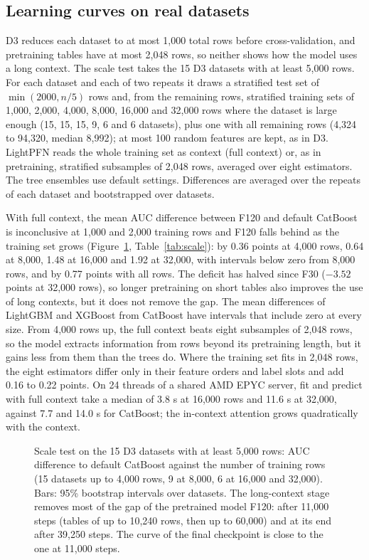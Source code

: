 \documentclass[11pt]{article}
\begin{document}
\subsection{Learning curves on real datasets}
D3 reduces each dataset to at most 1,000 total rows before cross-validation, and pretraining tables have
at most 2,048 rows, so neither
shows how the model uses a long context. The scale test takes the 15 D3 datasets with at least 5,000
rows. For each dataset and each of two repeats it draws a stratified test set of $\min(2000,n/5)$ rows
and, from the remaining rows, stratified training sets of 1,000, 2,000, 4,000, 8,000, 16,000 and
32,000 rows where the dataset is large enough (15, 15, 15, 9, 6 and 6 datasets), plus one with all
remaining rows (4,324 to 94,320, median 8,992); at most 100 random features are kept, as in D3.
LightPFN reads the whole training set as context (full context) or, as in pretraining, stratified
subsamples of 2,048 rows, averaged over eight estimators. The tree ensembles use default settings.
Differences are averaged over the repeats of each dataset and bootstrapped over datasets.

With full context, the mean AUC difference between F120 and default CatBoost is inconclusive at
1,000 and 2,000 training rows and F120 falls
behind as the training set grows (Figure~\ref{fig:scale}, Table~\ref{tab:scale}): by 0.36 points at
4,000 rows, 0.64 at 8,000, 1.48 at 16,000 and 1.92 at 32,000, with intervals below zero from 8,000
rows, and by 0.77 points with all rows. The deficit has halved since F30 ($-3.52$ points at 32,000
rows), so longer pretraining on short tables also improves the use of long contexts, but it does not
remove the gap. The mean differences of LightGBM and XGBoost from CatBoost have intervals that include
zero at every size. From 4,000 rows up, the
full context beats eight subsamples of 2,048 rows, so the model extracts information from rows beyond
its pretraining length, but it gains less from them than the trees do. Where the training set fits in
2,048 rows, the eight estimators differ only in their feature orders and label slots and add 0.16 to
0.22 points. On 24 threads of a shared AMD EPYC server, fit and predict with full context take a median of
3.8 s at 16,000 rows and 11.6 s at 32,000, against 7.7 and 14.0 s for CatBoost; the in-context
attention grows quadratically with the context.

\begin{figure}[tbp]
\centering

\caption{Scale test on the 15 D3 datasets with at least 5,000 rows: AUC difference to default CatBoost
against the number of training rows (15 datasets up to 4,000 rows, 9 at 8,000, 6 at 16,000 and
32,000). Bars: 95\% bootstrap intervals over datasets. The long-context stage removes most of the gap
of the pretrained model F120: after 11,000 steps (tables of up to 10,240 rows, then up to 60,000) and at
its end after 39,250 steps. The curve of the final checkpoint is close to the one at 11,000 steps.}
\label{fig:scale}
\end{figure}
\end{document}
